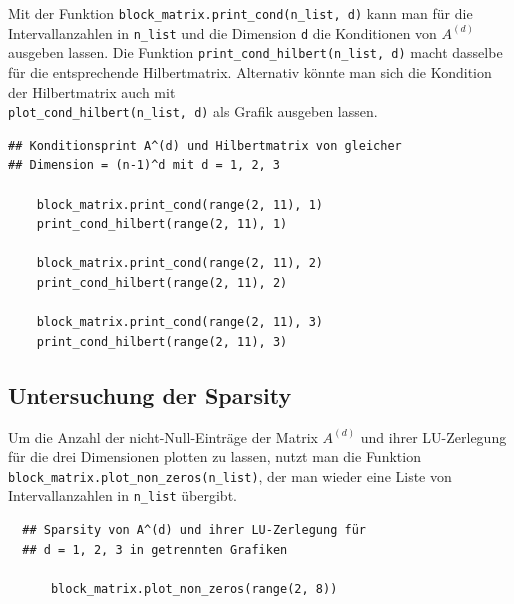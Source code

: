 \documentclass{scrartcl}
\begin{document}
Mit der Funktion \texttt{block\_matrix.print\_cond(n\_list, d)} kann man für die Intervallanzahlen in \texttt{n\_list} und die Dimension \texttt{d} die Konditionen von $A^{(d)}$ ausgeben lassen.
Die Funktion \texttt{print\_cond\_hilbert(n\_list, d)} macht dasselbe für die entsprechende Hilbertmatrix.
Alternativ könnte man sich die Kondition der Hilbertmatrix auch mit \\\texttt{plot\_cond\_hilbert(n\_list, d)} als Grafik ausgeben lassen.

\begin{verbatim}
## Konditionsprint A^(d) und Hilbertmatrix von gleicher
## Dimension = (n-1)^d mit d = 1, 2, 3

    block_matrix.print_cond(range(2, 11), 1)
    print_cond_hilbert(range(2, 11), 1)

    block_matrix.print_cond(range(2, 11), 2)
    print_cond_hilbert(range(2, 11), 2)

    block_matrix.print_cond(range(2, 11), 3)
    print_cond_hilbert(range(2, 11), 3)
\end{verbatim}

\subsection{Untersuchung der Sparsity}

Um die Anzahl der nicht-Null-Einträge der Matrix $A^{(d)}$ und ihrer LU-Zerlegung für die drei Dimensionen plotten zu lassen, nutzt man die Funktion \\\texttt{block\_matrix.plot\_non\_zeros(n\_list)}, der man wieder eine Liste von Intervallanzahlen in \texttt{n\_list} übergibt.

\begin{verbatim}
  ## Sparsity von A^(d) und ihrer LU-Zerlegung für
  ## d = 1, 2, 3 in getrennten Grafiken

      block_matrix.plot_non_zeros(range(2, 8))
\end{verbatim}
\end{document}
